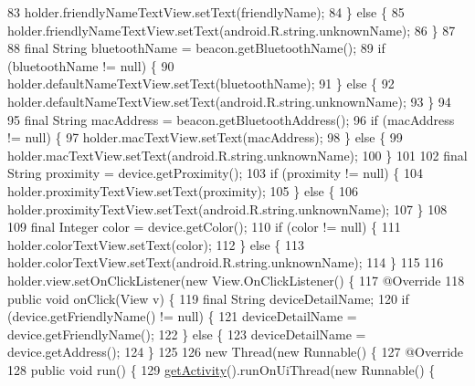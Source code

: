 \begin{DoxyCode}
{{83             holder.friendlyNameTextView.setText(friendlyName);
84         \} \textcolor{keywordflow}{else} \{
85             holder.friendlyNameTextView.setText(android.R.string.unknownName);
86         \}
87 
88         \textcolor{keyword}{final} String bluetoothName = beacon.getBluetoothName();
89         \textcolor{keywordflow}{if} (bluetoothName != null) \{
90             holder.defaultNameTextView.setText(bluetoothName);
91         \} \textcolor{keywordflow}{else} \{
92             holder.defaultNameTextView.setText(android.R.string.unknownName);
93         \}
94 
95         \textcolor{keyword}{final} String macAddress = beacon.getBluetoothAddress();
96         \textcolor{keywordflow}{if} (macAddress != null) \{
97             holder.macTextView.setText(macAddress);
98         \} \textcolor{keywordflow}{else} \{
99             holder.macTextView.setText(android.R.string.unknownName);
100         \}
101 
102         \textcolor{keyword}{final} String proximity = device.getProximity();
103         \textcolor{keywordflow}{if} (proximity != null) \{
104             holder.proximityTextView.setText(proximity);
105         \} \textcolor{keywordflow}{else} \{
106             holder.proximityTextView.setText(android.R.string.unknownName);
107         \}
108 
109         \textcolor{keyword}{final} Integer color = device.getColor();
110         \textcolor{keywordflow}{if} (color != null) \{
111             holder.colorTextView.setText(color);
112         \} \textcolor{keywordflow}{else} \{
113             holder.colorTextView.setText(android.R.string.unknownName);
114         \}
115 
116         holder.view.setOnClickListener(\textcolor{keyword}{new} View.OnClickListener() \{
117             @Override
118             \textcolor{keyword}{public} \textcolor{keywordtype}{void} onClick(View v) \{
119                 \textcolor{keyword}{final} String deviceDetailName;
120                 \textcolor{keywordflow}{if} (device.getFriendlyName() != null) \{
121                     deviceDetailName = device.getFriendlyName();
122                 \} \textcolor{keywordflow}{else} \{
123                     deviceDetailName = device.getAddress();
124                 \}
125 
126                 \textcolor{keyword}{new} Thread(\textcolor{keyword}{new} Runnable() \{
127                     @Override
128                     \textcolor{keyword}{public} \textcolor{keywordtype}{void} run() \{
129                         \hyperlink{classit_1_1unibo_1_1torsello_1_1bluetoothpositioning_1_1adapter_1_1DeviceCardViewAdapter_a0ff32c6bf5d84b68021bf586d64cacaf_a0ff32c6bf5d84b68021bf586d64cacaf}{getActivity}().runOnUiThread(\textcolor{keyword}{new} Runnable() \{
}}
\end{DoxyCode}
